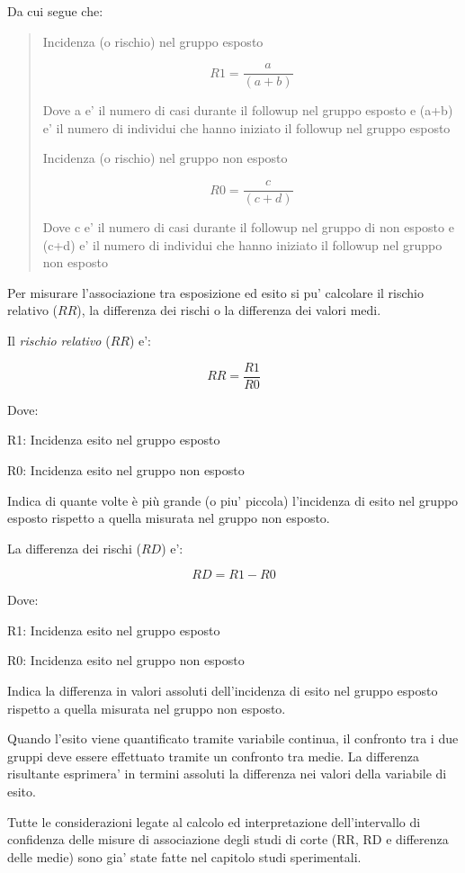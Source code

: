 \documentclass[]{book}
\begin{document}
Da cui segue che:

\begin{quote}
Incidenza (o rischio) nel gruppo esposto

\[R1 = \frac{a}{(a+b)}\]

Dove a e' il numero di casi durante il followup nel gruppo esposto e (a+b) e' il numero di individui che hanno iniziato il followup nel gruppo esposto

Incidenza (o rischio) nel gruppo non esposto

\[R0 = \frac{c}{(c+d)}\]

Dove c e' il numero di casi durante il followup nel gruppo di non esposto e (c+d) e' il numero di individui che hanno iniziato il followup nel gruppo non esposto
\end{quote}

Per misurare l'associazione tra esposizione ed esito si pu' calcolare il rischio relativo (\(RR\)), la differenza dei rischi o la differenza dei valori medi.

Il \emph{rischio relativo} (\(RR\)) e':

\[ RR = \frac{ R1 }{R0}\]

Dove:

R1: Incidenza esito nel gruppo esposto

R0: Incidenza esito nel gruppo non esposto

Indica di quante volte è più grande (o piu' piccola) l'incidenza di esito nel gruppo esposto rispetto a quella misurata nel gruppo non esposto.

La differenza dei rischi (\(RD\)) e':

\[ RD = { R1 -R0}\]

Dove:

R1: Incidenza esito nel gruppo esposto

R0: Incidenza esito nel gruppo non esposto

Indica la differenza in valori assoluti dell'incidenza di esito nel gruppo esposto rispetto a quella misurata nel gruppo non esposto.

Quando l'esito viene quantificato tramite variabile continua, il confronto tra i due gruppi deve essere effettuato tramite un confronto tra medie. La differenza risultante esprimera' in termini assoluti la differenza nei valori della variabile di esito.

Tutte le considerazioni legate al calcolo ed interpretazione dell'intervallo di confidenza delle misure di associazione degli studi di corte (RR, RD e differenza delle medie) sono gia' state fatte nel capitolo studi sperimentali.
\end{document}
